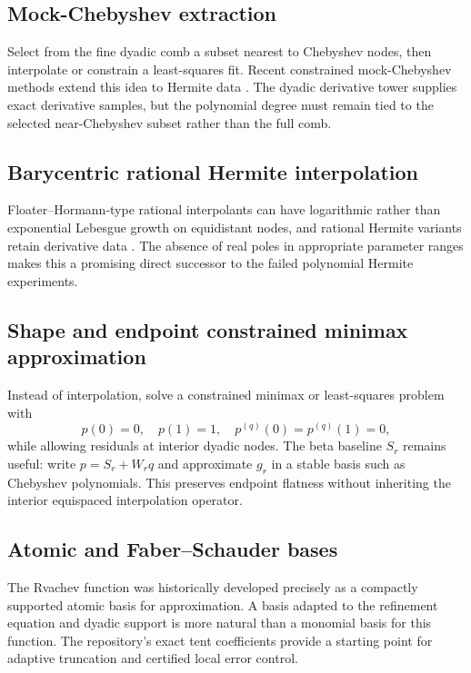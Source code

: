 \documentclass[11pt,oneside]{article}
\theoremstyle{definition}
\theoremstyle{remark}
\begin{document}
\subsection{Mock-Chebyshev extraction}

Select from the fine dyadic comb a subset nearest to Chebyshev nodes, then interpolate or constrain a least-squares fit.  Recent constrained mock-Chebyshev methods extend this idea to Hermite data \cite{mock-chebyshev-hermite}.  The dyadic derivative tower supplies exact derivative samples, but the polynomial degree must remain tied to the selected near-Chebyshev subset rather than the full comb.

\subsection{Barycentric rational Hermite interpolation}

Floater--Hormann-type rational interpolants can have logarithmic rather than exponential Lebesgue growth on equidistant nodes, and rational Hermite variants retain derivative data \cite{cirillo-hormann}.  The absence of real poles in appropriate parameter ranges makes this a promising direct successor to the failed polynomial Hermite experiments.

\subsection{Shape and endpoint constrained minimax approximation}

Instead of interpolation, solve a constrained minimax or least-squares problem with
\begin{equation}
 p(0)=0,\quad p(1)=1,\quad p^{(q)}(0)=p^{(q)}(1)=0,
 \end{equation}
while allowing residuals at interior dyadic nodes.  The beta baseline $S_r$ remains useful: write $p=S_r+W_rq$ and approximate $g_r$ in a stable basis such as Chebyshev polynomials.  This preserves endpoint flatness without inheriting the interior equispaced interpolation operator.

\subsection{Atomic and Faber--Schauder bases}

The Rvachev function was historically developed precisely as a compactly supported atomic basis for approximation.  A basis adapted to the refinement equation and dyadic support is more natural than a monomial basis for this function.  The repository's exact tent coefficients provide a starting point for adaptive truncation and certified local error control.
\end{document}
